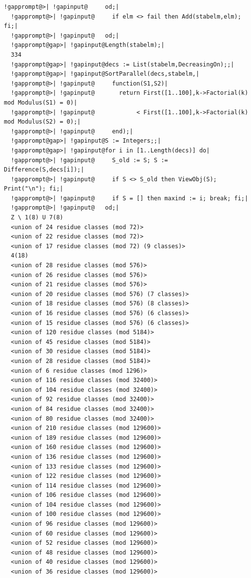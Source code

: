 \documentclass[a4paper,11pt]{report}
\begin{document}
{{\begin{Verbatim}[commandchars=!@|,fontsize=\small,frame=single,label=Example]
  !gapprompt@>| !gapinput@     od;|
  !gapprompt@>| !gapinput@     if elm <> fail then Add(stabelm,elm); fi;|
  !gapprompt@>| !gapinput@   od;|
  !gapprompt@gap>| !gapinput@Length(stabelm);|
  334
  !gapprompt@gap>| !gapinput@decs := List(stabelm,DecreasingOn);;|
  !gapprompt@gap>| !gapinput@SortParallel(decs,stabelm,|
  !gapprompt@>| !gapinput@     function(S1,S2)|
  !gapprompt@>| !gapinput@       return First([1..100],k->Factorial(k) mod Modulus(S1) = 0)|
  !gapprompt@>| !gapinput@            < First([1..100],k->Factorial(k) mod Modulus(S2) = 0);|
  !gapprompt@>| !gapinput@     end);|
  !gapprompt@gap>| !gapinput@S := Integers;;|
  !gapprompt@gap>| !gapinput@for i in [1..Length(decs)] do|
  !gapprompt@>| !gapinput@     S_old := S; S := Difference(S,decs[i]);|
  !gapprompt@>| !gapinput@     if S <> S_old then ViewObj(S); Print("\n"); fi;|
  !gapprompt@>| !gapinput@     if S = [] then maxind := i; break; fi;|
  !gapprompt@>| !gapinput@   od;|
  Z \ 1(8) U 7(8)
  <union of 24 residue classes (mod 72)>
  <union of 22 residue classes (mod 72)>
  <union of 17 residue classes (mod 72) (9 classes)>
  4(18)
  <union of 28 residue classes (mod 576)>
  <union of 26 residue classes (mod 576)>
  <union of 21 residue classes (mod 576)>
  <union of 20 residue classes (mod 576) (7 classes)>
  <union of 18 residue classes (mod 576) (8 classes)>
  <union of 16 residue classes (mod 576) (6 classes)>
  <union of 15 residue classes (mod 576) (6 classes)>
  <union of 120 residue classes (mod 5184)>
  <union of 45 residue classes (mod 5184)>
  <union of 30 residue classes (mod 5184)>
  <union of 28 residue classes (mod 5184)>
  <union of 6 residue classes (mod 1296)>
  <union of 116 residue classes (mod 32400)>
  <union of 104 residue classes (mod 32400)>
  <union of 92 residue classes (mod 32400)>
  <union of 84 residue classes (mod 32400)>
  <union of 80 residue classes (mod 32400)>
  <union of 210 residue classes (mod 129600)>
  <union of 189 residue classes (mod 129600)>
  <union of 160 residue classes (mod 129600)>
  <union of 136 residue classes (mod 129600)>
  <union of 133 residue classes (mod 129600)>
  <union of 122 residue classes (mod 129600)>
  <union of 114 residue classes (mod 129600)>
  <union of 106 residue classes (mod 129600)>
  <union of 104 residue classes (mod 129600)>
  <union of 100 residue classes (mod 129600)>
  <union of 96 residue classes (mod 129600)>
  <union of 60 residue classes (mod 129600)>
  <union of 52 residue classes (mod 129600)>
  <union of 48 residue classes (mod 129600)>
  <union of 40 residue classes (mod 129600)>
  <union of 36 residue classes (mod 129600)>

\end{Verbatim}}}
\end{document}
